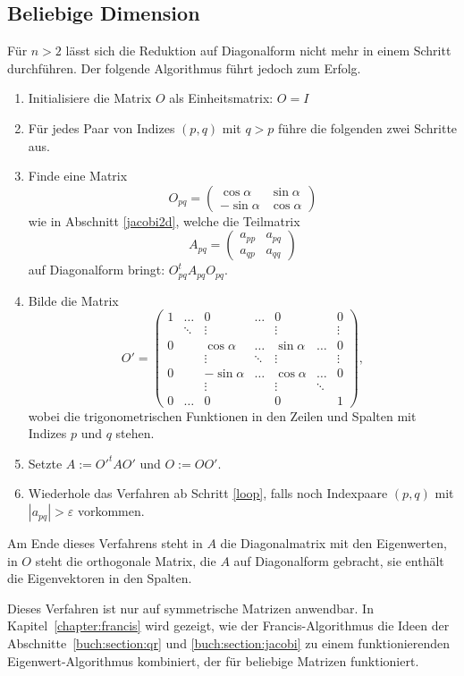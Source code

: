 \subsection{Beliebige Dimension}
Für $n>2$ lässt sich die Reduktion auf Diagonalform nicht mehr in einem
Schritt durchführen. Der folgende Algorithmus führt jedoch zum Erfolg.
\begin{enumerate}
\item Initialisiere die Matrix $O$ als Einheitsmatrix: $O=I$
\item \label{loop} Für jedes Paar von Indizes $(p,q)$ mit $q>p$ führe
die folgenden zwei Schritte aus.
\item Finde eine Matrix
\[
O_{pq}
=
\begin{pmatrix}
 \cos\alpha&\sin\alpha\\
-\sin\alpha&\cos\alpha
\end{pmatrix}
\]
wie in Abschnitt \ref{jacobi2d}, welche die Teilmatrix
\[
A_{pq}=\begin{pmatrix}a_{pp}&a_{pq}\\a_{qp}&a_{qq}\end{pmatrix}
\]
auf Diagonalform bringt: $O_{pq}^tA_{pq}O_{pq}$.
\item Bilde die Matrix
\[
O'=\begin{pmatrix}
1 &\dots &0         &\dots &0          &      &0\\
  &\ddots&\vdots    &      &\vdots     &      &\vdots\\
0 &      &\cos\alpha&\dots &\sin\alpha&\dots &0\\
  &      &\vdots    &\ddots&\vdots     &      &\vdots\\
0 &      &-\sin\alpha&\dots & \cos\alpha&\dots &0\\
  &      &\vdots    &      & \vdots    &\ddots& \\
0 &\dots &0         &      & 0         &      &1
\end{pmatrix},
\]
wobei die trigonometrischen Funktionen in den Zeilen und Spalten mit
Indizes $p$ und $q$ stehen.
\item Setzte $A:=O'^tAO'$ und $O:=OO'$.
\item Wiederhole das Verfahren ab Schritt \ref{loop}, falls noch Indexpaare
$(p,q)$ mit $|a_{pq}|>\varepsilon$ vorkommen.
\end{enumerate}
Am Ende dieses Verfahrens steht in $A$ die Diagonalmatrix mit den
Eigenwerten, in $O$ steht die orthogonale Matrix, die $A$ auf
Diagonalform gebracht, sie enthält die Eigenvektoren in den
Spalten.

Dieses Verfahren ist nur auf symmetrische Matrizen anwendbar.
%
In Kapitel~\ref{chapter:francis} wird gezeigt, wie der
Francis-Algorithmus die Ideen der Abschnitte~\ref{buch:section:qr}
und \ref{buch:section:jacobi} zu einem funktionierenden
Eigenwert-Algorithmus kombiniert, der für beliebige Matrizen funktioniert.



